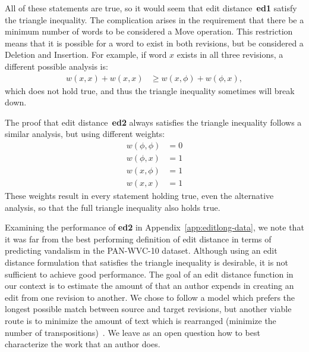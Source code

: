 All of these statements are true, so it would seem that
edit distance~\textbf{ed1} satisfy the triangle inequality.
The complication arises in the requirement
that there be a minimum number of words to be considered a
Move operation.
This restriction means that it is possible for a word to exist
in both revisions, but be considered a Deletion and Insertion.
For example, if word $x$ exists in all three revisions, a different
possible analysis is:
  \begin{align*}
    w(x, x) + w(x, x) & \ge w(x, \phi) + w(\phi, x),
  \end{align*}
which does not hold true, and thus the triangle inequality sometimes
will break down.

\bigskip

The proof that edit distance~\textbf{ed2} always satisfies the
triangle inequality follows a similar analysis, but using different
weights:
\begin{align*}
  w(\phi, \phi) &= 0 \\
  w(\phi, x) &= 1 \\
  w(x, \phi) &= 1 \\
  w(x, x) &= 1
\end{align*}
These weights result in every statement holding true, even the
alternative analysis, so that the
full triangle inequality also holds true.

Examining the performance of \textbf{ed2} in
Appendix~\ref{app:editlong-data}, we note that it was far from the best
performing definition of edit distance in terms of predicting vandalism
in the PAN-WVC-10 dataset.
Although using an edit distance formulation that satisfies the triangle
inequality is desirable, it is not sufficient to achieve good
performance.
The goal of an edit distance function in our context is to estimate
the amount of  that an author expends in creating an
edit from one revision to another.
We chose to follow a model which prefers the longest possible match
between source and target revisions, but another viable route is to
minimize the amount of text which is rearranged (\ie minimize the
number of transpositions)~\cite{Wagner1975}.
We leave as an open question how to best characterize the work
that an author does.

